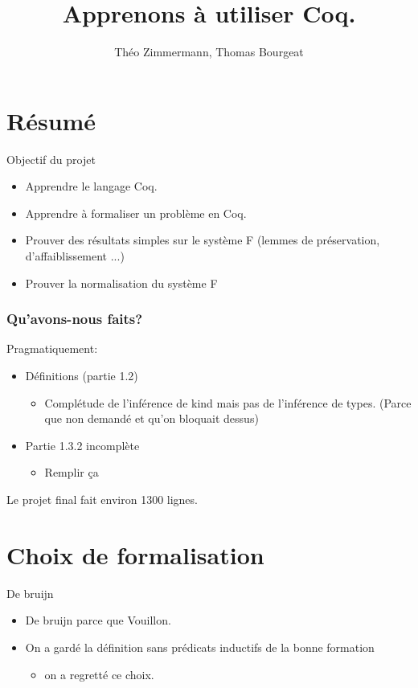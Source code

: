 \documentclass{beamer}
\begin{document}
	\title{Apprenons à utiliser Coq.}
	\author{Théo Zimmermann, Thomas Bourgeat}
\frame{\titlepage}

\section{Résumé}

\begin{frame}
Objectif du projet
\begin{itemize}
\item Apprendre le langage Coq.
\pause
\item Apprendre à formaliser un problème en Coq.
\pause
\item {\scriptsize Prouver des résultats simples sur le système F (lemmes de
préservation, d'affaiblissement ...)}
\item {\tiny Prouver la normalisation du système F}
\end{itemize}


\end{frame}

    \begin{frame}
    \frametitle{Qu'avons-nous faits?}
    Pragmatiquement:
	\begin{itemize}
	\pause
	\item Définitions (partie 1.2)
	\begin{itemize}
	\item Complétude de l'inférence de kind mais pas de l'inférence
	de types. (Parce que non demandé et qu'on bloquait dessus)
	\end{itemize}
	\pause
	\item Partie 1.3.2 incomplète
	\begin{itemize}
	\item Remplir ça
	\end{itemize}
	\end{itemize}
	Le projet final fait environ 1300 lignes.
    \end{frame}
     
		
\section{Choix de formalisation}


\begin{frame}{De bruijn}
\begin{itemize}
\item De bruijn parce que Vouillon.
\pause
\item On a gardé la définition sans prédicats inductifs de la bonne
formation
\pause
\begin{itemize}
\item on a regretté ce choix.
\end{itemize}
\end{itemize}
\end{frame}
\end{document}
